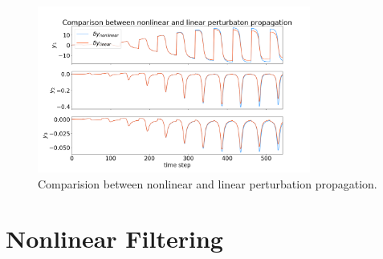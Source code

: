 \documentclass[11pt, a4paper]{article}
\begin{document}
\begin{figure}[H]
	\centering
	\includegraphics[width=0.8\textwidth]{./Figures/nonlvl_meas.png}
	\caption{Comparision between nonlinear and linear perturbation propagation.}
	\label{fig:nlvl_m}
\end{figure}


\section{Nonlinear Filtering}
\end{document}
